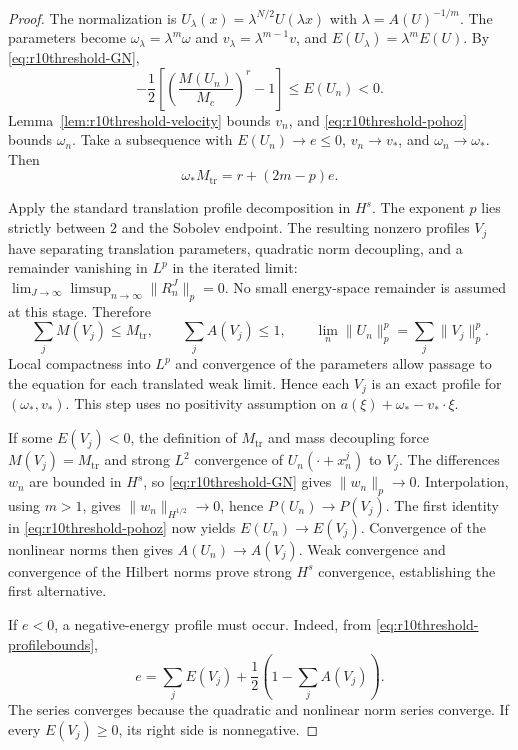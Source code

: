 \begin{proof}
The normalization is
$U_\lambda(x)=\lambda^{N/2}U(\lambda x)$ with
$\lambda=A(U)^{-1/m}$. The parameters become
$\omega_\lambda=\lambda^m\omega$ and
$v_\lambda=\lambda^{m-1}v$, and $E(U_\lambda)=\lambda^mE(U)$.
By \eqref{eq:r10threshold-GN},
\[
 -\frac12\left[\left(\frac{M(U_n)}{M_c}\right)^r-1\right]
 \le E(U_n)<0.
\]
Lemma~\ref{lem:r10threshold-velocity} bounds $v_n$, and
\eqref{eq:r10threshold-pohoz} bounds $\omega_n$. Take a subsequence
with $E(U_n)\to e\le0$, $v_n\to v_*$, and $\omega_n\to\omega_*$.
Then
\begin{equation}\label{eq:r10threshold-omegalimit}
 \omega_*M_{\mathrm{tr}}=r+(2m-p)e.
\end{equation}

Apply the standard translation profile decomposition in $H^s$.
The exponent $p$ lies strictly between $2$ and the Sobolev endpoint.
The resulting nonzero profiles $V_j$ have separating translation
parameters, quadratic norm decoupling, and a remainder vanishing in
$L^p$ in the iterated limit:
$\lim_{J\to\infty}\limsup_{n\to\infty}\|R_n^J\|_p=0$.
No small energy-space remainder is assumed at this stage. Therefore
\begin{equation}\label{eq:r10threshold-profilebounds}
 \sum_jM(V_j)\le M_{\mathrm{tr}},\qquad
 \sum_jA(V_j)\le1,\qquad
 \lim_n\|U_n\|_p^p=\sum_j\|V_j\|_p^p.
\end{equation}
Local compactness into $L^p$ and convergence of the parameters allow
passage to the equation for each translated weak limit. Hence each
$V_j$ is an exact profile for $(\omega_*,v_*)$. This step uses no
positivity assumption on $a(\xi)+\omega_*-v_*\cdot\xi$.

If some $E(V_j)<0$, the definition of $M_{\mathrm{tr}}$ and mass
decoupling force $M(V_j)=M_{\mathrm{tr}}$ and strong $L^2$
convergence of $U_n(\cdot+x_n^j)$ to $V_j$. The differences $w_n$
are bounded in $H^s$, so \eqref{eq:r10threshold-GN} gives
$\|w_n\|_p\to0$. Interpolation, using $m>1$, gives
$\|w_n\|_{H^{1/2}}\to0$, hence $P(U_n)\to P(V_j)$.
The first identity in \eqref{eq:r10threshold-pohoz} now yields
$E(U_n)\to E(V_j)$. Convergence of the nonlinear norms then gives
$A(U_n)\to A(V_j)$. Weak convergence and convergence of the
Hilbert norms prove strong $H^s$ convergence, establishing the
first alternative.

If $e<0$, a negative-energy profile must occur. Indeed, from
\eqref{eq:r10threshold-profilebounds},
\begin{equation}\label{eq:r10threshold-energysplit}
 e=\sum_j E(V_j)+\frac12\left(1-\sum_j A(V_j)\right).
\end{equation}
The series converges because the quadratic and nonlinear norm series
converge. If every $E(V_j)\ge0$, its right side is nonnegative.


\end{proof}
